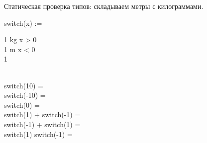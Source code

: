 %
%
%
%
%
%



    Статическая проверка типов: складываем метры с килограммами.

    \begin{preproc}

        switch(x) := \begin{caseblock}
                         1 \cdot kg \when x > 0 \\
                         1 \cdot m \when x < 0 \\
                         1 \otherwise
        \end{caseblock} \\

        switch(10) = \placeholder{} \\
        switch(-10) = \placeholder{} \\
        switch(0) = \placeholder{} \\
        switch(1) + switch(-1) = \placeholder{} \\
        switch(-1) + switch(1) = \placeholder{} \\
        switch(1) \cdot switch(-1) = \placeholder{} \\

    \end{preproc}


